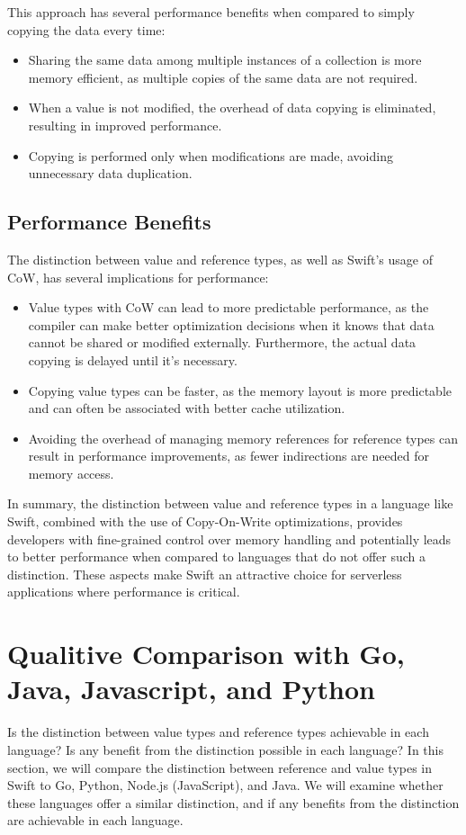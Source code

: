 This approach has several performance benefits when compared to simply copying the data every time:

\begin{itemize}
  \item Sharing the same data among multiple instances of a collection is more memory efficient, as multiple copies of the same data are not required.
  \item When a value is not modified, the overhead of data copying is eliminated, resulting in improved performance.
  \item Copying is performed only when modifications are made, avoiding unnecessary data duplication.
\end{itemize}

\subsection{Performance Benefits}

The distinction between value and reference types, as well as Swift's usage of CoW, has several implications for performance:

\begin{itemize}
  \item Value types with CoW can lead to more predictable performance, as the compiler can make better optimization decisions when it knows that data cannot be shared or modified externally. Furthermore, the actual data copying is delayed until it's necessary.
  \item Copying value types can be faster, as the memory layout is more predictable and can often be associated with better cache utilization.
  \item Avoiding the overhead of managing memory references for reference types can result in performance improvements, as fewer indirections are needed for memory access.
\end{itemize}

In summary, the distinction between value and reference types in a language like Swift, combined with the use of Copy-On-Write optimizations, provides developers with fine-grained control over memory handling and potentially leads to better performance when compared to languages that do not offer such a distinction. These aspects make Swift an attractive choice for serverless applications where performance is critical.


\section{Qualitive Comparison with Go, Java, Javascript, and Python}
Is the distinction between value types and reference types achievable in each language? Is any benefit from the distinction possible in each language? 
In this section, we will compare the distinction between reference and value types in Swift to Go, Python, Node.js (JavaScript), and Java. We will examine whether these languages offer a similar distinction, and if any benefits from the distinction are achievable in each language.

